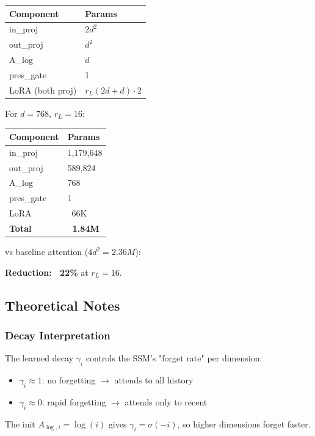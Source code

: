 \begin{table}[H]
\centering
\small
\begin{tabular}{ll}
\toprule
\textbf{Component} & \textbf{Params} \\
\midrule
in\_proj & $2 d^2$ \\
out\_proj & $d^2$ \\
A\_log & $d$ \\
pres\_gate & 1 \\
LoRA (both proj) & $r_L (2d + d) \cdot 2$ \\
\bottomrule
\end{tabular}
\end{table}

For $d = 768$, $r_L = 16$:

\begin{table}[H]
\centering
\small
\begin{tabular}{ll}
\toprule
\textbf{Component} & \textbf{Params} \\
\midrule
in\_proj & 1,179,648 \\
out\_proj & 589,824 \\
A\_log & 768 \\
pres\_gate & 1 \\
LoRA & ~66K \\
\textbf{Total} & \textbf{~1.84M} \\
\bottomrule
\end{tabular}
\end{table}

vs baseline attention ($4 d^2 = 2.36M$):

\textbf{Reduction: ~22\%} at $r_L = 16$.

\subsection{Theoretical Notes}

\subsubsection{Decay Interpretation}

The learned decay $\gamma_i$ controls the SSM's "forget rate" per dimension:

\begin{itemize}
\item $\gamma_i \approx 1$: no forgetting $\to$ attends to all history
\item $\gamma_i \approx 0$: rapid forgetting $\to$ attends only to recent

\end{itemize}
The init $A_{\log, i} = \log(i)$ gives $\gamma_i = \sigma(-i)$, so higher 
dimensions forget faster.

